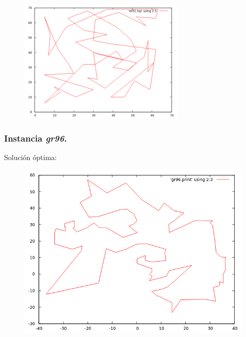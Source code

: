 \documentclass[11pt,a4paper]{article}
\begin{document}
				\vspace{5mm}

				\begin{figure}[h]

					\centering
					\includegraphics[width=0.7\textwidth]{eil51IR.png}
					
				\end{figure}

\newpage

			\subsubsection{Instancia \textit{gr96}.}

				\par
				Solución óptima:

				\vspace{5mm}

				\begin{figure}[h]

					\centering
					\includegraphics[width=1\textwidth]{gr96OPT.png}
					
				\end{figure}
\end{document}
